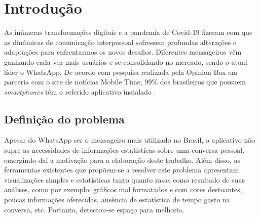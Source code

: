 \chapter{Introdução}

As inúmeras transformações digitais e a pandemia de Covid-19 fizeram com que as dinâmicas de comunicação interpessoal sofressem profundas alterações e adaptações para enfrentarmos os novos desafios. Diferentes mensageiros vêm ganhando cada vez mais usuários e se consolidando no mercado, sendo o atual líder o WhatsApp. De acordo com pesquisa realizada pela Opinion Box em parceria com o site de notícias Mobile Time, 99\% dos brasileiros que possuem \textit{smartphones} têm o referido aplicativo instalado .

\section{Definição do problema}

Apesar do WhatsApp ser o mensageiro mais utilizado no Brasil, o aplicativo não supre as necessidades de informações estatísticas sobre uma conversa pessoal, emergindo daí a motivação para a elaboração deste trabalho. Além disso, as ferramentas existentes que propõem-se a resolver este problema apresentam visualizações simples e estatísticas tanto quanto rasas como resultado de suas análises, como por exemplo: gráficos mal formatados e com cores destoantes, poucas informações oferecidas, ausência de estatística de tempo gasto na conversa, etc. Portanto, detectou-se espaço para melhoria.